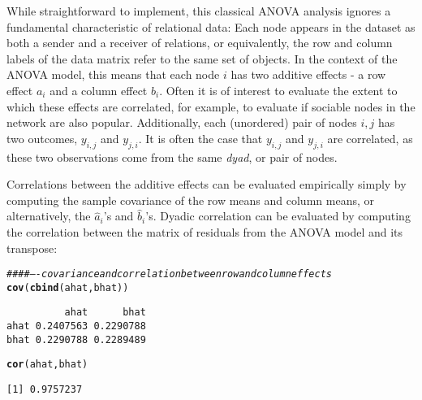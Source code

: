 \documentclass[11pt]{article}\usepackage[]{graphicx}\usepackage[]{color}
\makeatletter
\newcommand{\hlcom}[1]{\textcolor[rgb]{0.678,0.584,0.686}{\textit{#1}}}%
\newcommand{\hlstd}[1]{\textcolor[rgb]{0.345,0.345,0.345}{#1}}%
\newcommand{\hlkwd}[1]{\textcolor[rgb]{0.737,0.353,0.396}{\textbf{#1}}}%
\newenvironment{kframe}{%
 \def\at@end@of@kframe{}%
 \ifinner\ifhmode%
  \def\at@end@of@kframe{\end{minipage}}%
  \begin{minipage}{\columnwidth}%
 \fi\fi%
 \def\FrameCommand##1{\hskip\@totalleftmargin \hskip-\fboxsep
 \colorbox{shadecolor}{##1}\hskip-\fboxsep
     \hskip-\linewidth \hskip-\@totalleftmargin \hskip\columnwidth}%
 \MakeFramed {\advance\hsize-\width
   \@totalleftmargin\z@ \linewidth\hsize
   \@setminipage}}%
 {\par\unskip\endMakeFramed%
 \at@end@of@kframe}
\newenvironment{knitrout}{}{} %
\makeatother
\begin{document}
While straightforward to implement, this classical ANOVA analysis ignores 
a fundamental characteristic of relational data: Each node
appears in the dataset as both a sender and a receiver of 
relations, or equivalently, the 
row and column labels of the data matrix refer to the same set of 
objects. 
In the context of the ANOVA model, 
this means that 
each node $i$ has two additive effects - a row effect 
$a_i$  and a column effect $b_i$.  
Often it is of interest to evaluate the extent to which 
these effects are correlated, for example, to 
evaluate if sociable nodes in the network are also 
popular. 
Additionally, 
each  (unordered) pair of nodes $i,j$ has two 
outcomes, $y_{i,j}$ and $y_{j,i}$.  
It is often the case that
$y_{i,j}$ and $y_{j,i}$ are correlated, as these 
two observations come from the same \emph{dyad}, or pair of nodes. 

Correlations between the additive effects can be evaluated empirically  
simply by computing the sample covariance of the 
row means and column means, or 
alternatively, the $\hat a_i$'s and 
$\hat b_i$'s. 
Dyadic correlation can be evaluated by computing the
correlation between the  matrix of residuals from the ANOVA 
model and its transpose:

\begin{knitrout}\footnotesize
{}\color{fgcolor}\begin{kframe}
\begin{alltt}
\hlcom{#### ---- covariance and correlation between row and column effects}
\hlkwd{cov}\hlstd{(} \hlkwd{cbind}\hlstd{(ahat,bhat) )}
\end{alltt}
\begin{verbatim}
          ahat      bhat
ahat 0.2407563 0.2290788
bhat 0.2290788 0.2289489
\end{verbatim}
\begin{alltt}
\hlkwd{cor}\hlstd{( ahat, bhat)}
\end{alltt}
\begin{verbatim}
[1] 0.9757237
\end{verbatim}
\end{kframe}
\end{knitrout}
\end{document}

